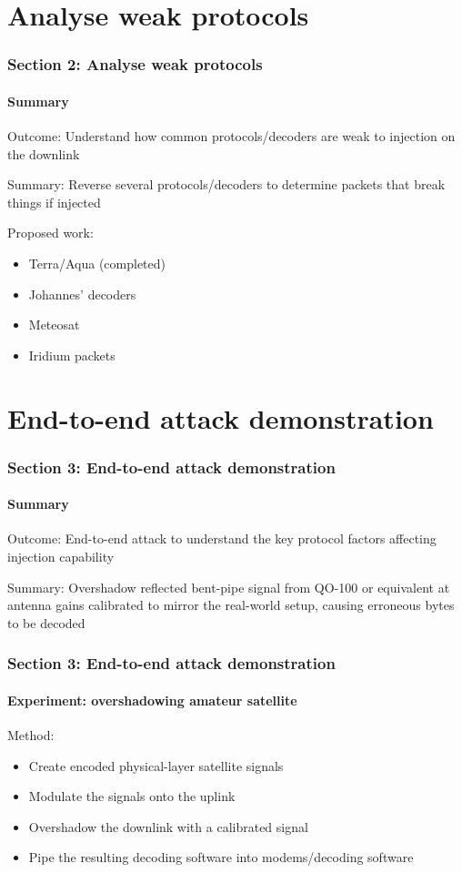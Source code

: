 \documentclass{beamer}
\begin{document}
\section{Analyse weak protocols}

\begin{frame}
  \frametitle{Section 2: Analyse weak protocols}
  \framesubtitle{Summary}

  Outcome: Understand how common protocols/decoders are weak to injection on the downlink

  Summary: Reverse several protocols/decoders to determine packets that break things if injected

  Proposed work:
  \begin{itemize}
    \item Terra/Aqua (completed)
    \item Johannes' decoders
    \item Meteosat
    \item Iridium packets
  \end{itemize}
\end{frame}

\section{End-to-end attack demonstration}

\begin{frame}
  \frametitle{Section 3: End-to-end attack demonstration}
  \framesubtitle{Summary}

  Outcome: End-to-end attack to understand the key protocol factors affecting injection capability

  Summary: Overshadow reflected bent-pipe signal from QO-100 or equivalent at antenna gains calibrated to mirror the real-world setup, causing erroneous bytes to be decoded
\end{frame}

\begin{frame}
  \frametitle{Section 3: End-to-end attack demonstration}
  \framesubtitle{Experiment: overshadowing amateur satellite}

  Method:
  \begin{itemize}
    \item Create encoded physical-layer satellite signals
    \item Modulate the signals onto the uplink
    \item Overshadow the downlink with a calibrated signal
    \item Pipe the resulting decoding software into modems/decoding software
  \end{itemize}
\end{frame}
\end{document}
